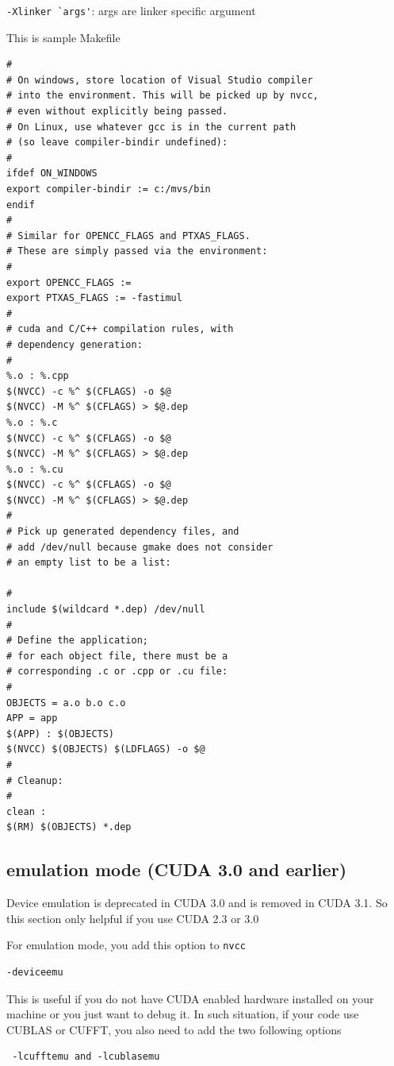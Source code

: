 \verb!-Xlinker `args'!: args are linker specific argument 

This is sample Makefile 
\begin{verbatim}
#
# On windows, store location of Visual Studio compiler
# into the environment. This will be picked up by nvcc,
# even without explicitly being passed.
# On Linux, use whatever gcc is in the current path
# (so leave compiler-bindir undefined):
#
ifdef ON_WINDOWS
export compiler-bindir := c:/mvs/bin
endif
#
# Similar for OPENCC_FLAGS and PTXAS_FLAGS.
# These are simply passed via the environment:
#
export OPENCC_FLAGS :=
export PTXAS_FLAGS := -fastimul
#
# cuda and C/C++ compilation rules, with
# dependency generation:
#
%.o : %.cpp
$(NVCC) -c %^ $(CFLAGS) -o $@
$(NVCC) -M %^ $(CFLAGS) > $@.dep
%.o : %.c
$(NVCC) -c %^ $(CFLAGS) -o $@
$(NVCC) -M %^ $(CFLAGS) > $@.dep
%.o : %.cu
$(NVCC) -c %^ $(CFLAGS) -o $@
$(NVCC) -M %^ $(CFLAGS) > $@.dep
#
# Pick up generated dependency files, and
# add /dev/null because gmake does not consider
# an empty list to be a list:

#
include $(wildcard *.dep) /dev/null
#
# Define the application;
# for each object file, there must be a
# corresponding .c or .cpp or .cu file:
#
OBJECTS = a.o b.o c.o
APP = app
$(APP) : $(OBJECTS)
$(NVCC) $(OBJECTS) $(LDFLAGS) -o $@
#
# Cleanup:
#
clean :
$(RM) $(OBJECTS) *.dep
\end{verbatim}

\subsection{emulation mode (CUDA 3.0 and earlier)}
\label{sec:emulation-mode}

\begin{framed}
  Device emulation is deprecated in CUDA 3.0 and is removed in CUDA
  3.1. So this section only helpful if you use CUDA 2.3 or 3.0
\end{framed}

For emulation mode, you add this option to \verb!nvcc!
\begin{verbatim}
-deviceemu 
\end{verbatim}
This is useful if you do not have CUDA enabled hardware installed on
your machine or you just want to debug it. In such situation, if your
code use CUBLAS or CUFFT, you also need to add the two following
options
\begin{verbatim}
 -lcufftemu and -lcublasemu 
\end{verbatim}

